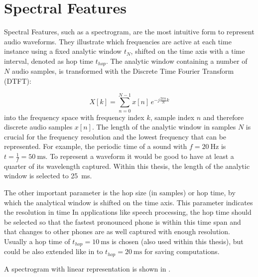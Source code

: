 
\section{Spectral Features}\label{sec:signal_spec}
Spectral Features, such as a spectrogram, are the most intuitive form to represent audio waveforms. 
They illustrate which frequencies are active at each time instance using a fixed analytic window $t_N$, shifted on the time axis with a time interval, denoted as hop time $t_{hop}$.
The analytic window containing a number of $N$ audio samples, is transformed with the Discrete Time Fourier Transform (DTFT):

\begin{equation}\label{eq:signal_spec_dtft}
    X[k] = \sum_{n=0}^{N-1} x[n] \, e^{-j\frac{2 \pi n}{N}k}
\end{equation}
into the frequency space with frequency index $k$, sample index $n$ and therefore discrete audio samples $x[n]$.
The length of the analytic window in samples $N$ is crucial for the frequency resolution and the lowest frequency that can be represented.
For example, the periodic time of a sound with $f=\SI{20}{\hertz}$ is $t=\frac{1}{f} = \SI{50}{\milli\second}$.
To represent a waveform it would be good to have at least a quarter of its wavelength captured.
Within this thesis, the length of the analytic window is selected to \SI{25}{\milli\second}.

The other important parameter is the hop size (in samples) or hop time, by which the analytical window is shifted on the time axis.
This parameter indicates the resolution in time
In applications like speech processing, the hop time should be selected so that the fastest pronounced phone is within this time span and that changes to other phones are as well captured with enough resolution.
Usually a hop time of $t_{hop}=\SI{10}{\milli\second}$ is chosen (also used within this thesis), but could be also extended like in \cite{Peter2020} to $t_{hop}=\SI{20}{\milli\second}$ for saving computations.








A spectrogram with linear representation is shown in .

